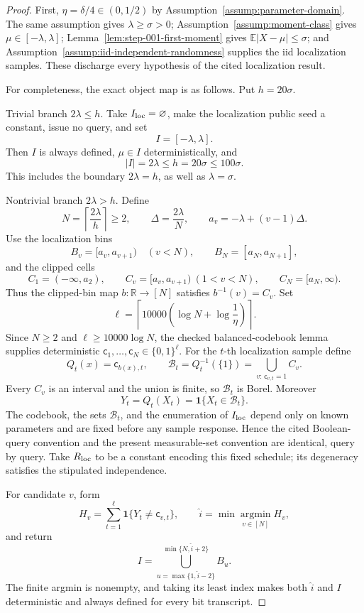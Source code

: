 \begin{proof}
First, \(\eta=\delta/4\in(0,1/2)\) by Assumption~\ref{assump:parameter-domain}. The same assumption gives \(\lambda\geq\sigma>0\); Assumption~\ref{assump:moment-class} gives \(\mu\in[-\lambda,\lambda]\); Lemma~\ref{lem:step-001-first-moment} gives \(\mathbb E|X-\mu|\leq\sigma\); and Assumption~\ref{assump:iid-independent-randomness} supplies the iid localization samples. These discharge every hypothesis of the cited localization result.

For completeness, the exact object map is as follows. Put \(h=20\sigma\).

Trivial branch \(2\lambda\leq h\). Take \(I_{\rm loc}=\varnothing\), make the localization public seed a constant, issue no query, and set
\[
I=[-\lambda,\lambda].
\]
Then \(I\) is always defined, \(\mu\in I\) deterministically, and
\[
|I|=2\lambda\leq h=20\sigma\leq100\sigma.
\]
This includes the boundary \(2\lambda=h\), as well as \(\lambda=\sigma\).

Nontrivial branch \(2\lambda>h\). Define
\[
N=\left\lceil\frac{2\lambda}{h}\right\rceil\geq2,
\qquad
\Delta=\frac{2\lambda}{N},
\qquad
a_v=-\lambda+(v-1)\Delta.
\]
Use the localization bins
\[
B_v=[a_v,a_{v+1})\quad(v<N),
\qquad
B_N=[a_N,a_{N+1}],
\]
and the clipped cells
\[
C_1=(-\infty,a_2),
\qquad
C_v=[a_v,a_{v+1})\ (1<v<N),
\qquad
C_N=[a_N,\infty).
\]
Thus the clipped-bin map \(b:\mathbb R\to[N]\) satisfies \(b^{-1}(v)=C_v\). Set
\[
\ell=\left\lceil10000\left(\log N+\log\frac1\eta\right)\right\rceil.
\]
Since \(N\geq2\) and \(\ell\geq10000\log N\), the checked balanced-codebook lemma supplies deterministic \(\mathsf c_1,\ldots,\mathsf c_N\in\{0,1\}^{\ell}\). For the \(t\)-th localization sample define
\[
Q_t(x)=\mathsf c_{b(x),t},
\qquad
\mathcal B_t=Q_t^{-1}(\{1\})
=\bigcup_{v:\,\mathsf c_{v,t}=1}C_v.
\]
Every \(C_v\) is an interval and the union is finite, so \(\mathcal B_t\) is Borel. Moreover
\[
Y_t=Q_t(X_t)=\mathbf1\{X_t\in\mathcal B_t\}.
\]
The codebook, the sets \(\mathcal B_t\), and the enumeration of \(I_{\rm loc}\) depend only on known parameters and are fixed before any sample response. Hence the cited Boolean-query convention and the present measurable-set convention are identical, query by query. Take \(R_{\rm loc}\) to be a constant encoding this fixed schedule; its degeneracy satisfies the stipulated independence.

For candidate \(v\), form
\[
H_v=\sum_{t=1}^{\ell}\mathbf1\{Y_t\neq\mathsf c_{v,t}\},
\qquad
\widehat i=\min\operatorname*{argmin}_{v\in[N]}H_v,
\]
and return
\[
I=\bigcup_{u=\max\{1,\widehat i-2\}}^{\min\{N,\widehat i+2\}}B_u.
\]
The finite argmin is nonempty, and taking its least index makes both \(\widehat i\) and \(I\) deterministic and always defined for every bit transcript.


\end{proof}
